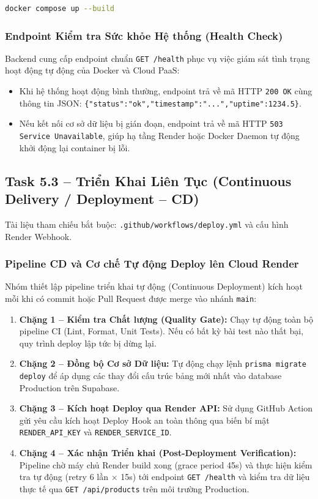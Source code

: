 \documentclass[11pt,a4paper]{article}
\begin{document}
\begin{lstlisting}[language=bash,backgroundcolor=\color{tableheader!50},basicstyle=\small\ttfamily,frame=single]
docker compose up --build
\end{lstlisting}

\subsubsection{Endpoint Kiểm tra Sức khỏe Hệ thống (Health Check)}
Backend cung cấp endpoint chuẩn \texttt{GET /health} phục vụ việc giám sát tình trạng hoạt động tự động của Docker và Cloud PaaS:
\begin{itemize}[leftmargin=*]
    \item Khi hệ thống hoạt động bình thường, endpoint trả về mã HTTP \texttt{200 OK} cùng thông tin JSON: \texttt{\{"status":"ok","timestamp":"...","uptime":1234.5\}}.
    \item Nếu kết nối cơ sở dữ liệu bị gián đoạn, endpoint trả về mã HTTP \texttt{503 Service Unavailable}, giúp hạ tầng Render hoặc Docker Daemon tự động khởi động lại container bị lỗi.
\end{itemize}

\subsection{Task 5.3 -- Triển Khai Liên Tục (Continuous Delivery / Deployment -- CD)}

Tài liệu tham chiếu bắt buộc: \texttt{.github/workflows/deploy.yml} và cấu hình Render Webhook.

\subsubsection{Pipeline CD và Cơ chế Tự động Deploy lên Cloud Render}
Nhóm thiết lập pipeline triển khai tự động (Continuous Deployment) kích hoạt mỗi khi có commit hoặc Pull Request được merge vào nhánh \texttt{main}:
\begin{enumerate}[leftmargin=*]
    \item \textbf{Chặng 1 -- Kiểm tra Chất lượng (Quality Gate):} Chạy tự động toàn bộ pipeline CI (Lint, Format, Unit Tests). Nếu có bất kỳ bài test nào thất bại, quy trình deploy lập tức bị dừng lại.
    \item \textbf{Chặng 2 -- Đồng bộ Cơ sở Dữ liệu:} Tự động chạy lệnh \texttt{prisma migrate deploy} để áp dụng các thay đổi cấu trúc bảng mới nhất vào database Production trên Supabase.
    \item \textbf{Chặng 3 -- Kích hoạt Deploy qua Render API:} Sử dụng GitHub Action gửi yêu cầu kích hoạt Deploy Hook an toàn thông qua biến bí mật \texttt{RENDER\_API\_KEY} và \texttt{RENDER\_SERVICE\_ID}.
    \item \textbf{Chặng 4 -- Xác nhận Triển khai (Post-Deployment Verification):} Pipeline chờ máy chủ Render build xong (grace period 45s) và thực hiện kiểm tra tự động (retry 6 lần $\times$ 15s) tới endpoint \texttt{GET /health} và kiểm tra dữ liệu thực tế qua \texttt{GET /api/products} trên môi trường Production.
\end{enumerate}
\end{document}
